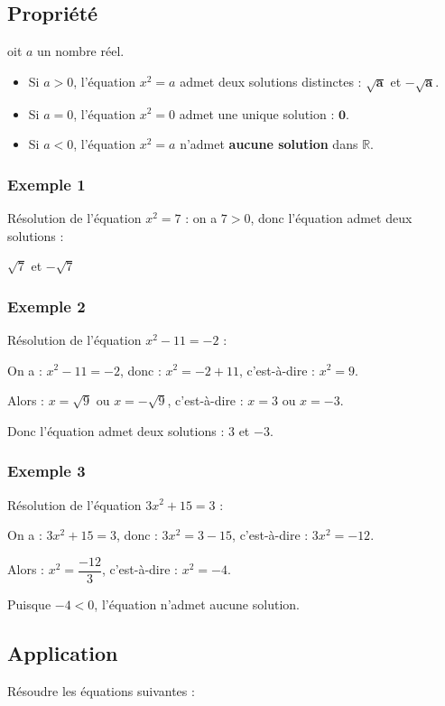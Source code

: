 \documentclass[12pt,a4paper]{article}
\begin{document}
\subsection*{\color{myred} Propriété }
oit $a$ un nombre réel.
\begin{itemize}
    \item Si $a > 0$, l'équation $x^2 = a$ admet deux solutions distinctes : $\mathbf{\sqrt{a}}$ et $\mathbf{-\sqrt{a}}$.
    \item Si $a = 0$, l'équation $x^2 = 0$ admet une unique solution : $\mathbf{0}$.
    \item Si $a < 0$, l'équation $x^2 = a$ n'admet \textbf{aucune solution} dans $\mathbb{R}$.
\end{itemize}
\subsubsection*{\color{myred} Exemple 1}

Résolution de l'équation $x^2 = 7$  : on a  $7 > 0$,  donc l'équation admet deux solutions :


$\sqrt{7} $ et $-\sqrt{7}$

\subsubsection*{\color{myred} Exemple 2}
Résolution de l'équation $x^2 - 11 = -2$ :

On a : $x^2 - 11 = -2$, donc : $x^2 = -2 + 11$, c'est-à-dire : $x^2 = 9$.

Alors : $x = \sqrt{9}$ ou $x = -\sqrt{9}$, c'est-à-dire : $x = 3$ ou $x = -3$.

Donc l'équation admet deux solutions : $3$ et $-3$.
\subsubsection*{\color{myred} Exemple 3}
Résolution de l'équation $3x^2 + 15 = 3$ :

On a : $3x^2 + 15 = 3$, donc : $3x^2 = 3 - 15$, c'est-à-dire : $3x^2 = -12$.

Alors : $x^2 = \dfrac{-12}{3}$, c'est-à-dire : $x^2 = -4$.

Puisque $-4 < 0$, l'équation n'admet aucune solution.
\subsection*{\color{myred} Application }

Résoudre les équations suivantes :
\end{document}
